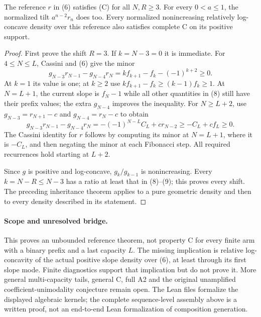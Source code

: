 \begin{theorem}
The reference $r$ in (6) satisfies (C) for all $N,R\ge3$.
For every $0<a\le1$, the normalized tilt $a^{n-2}r_n$ does too.
Every normalized nonincreasing relatively log-concave density over
this reference also satisfies complete C on its positive support.
\end{theorem}
\begin{proof}
First prove the shift $R=3$.  If $k=N-3=0$ it is immediate.
For $4\le N\le L$, Cassini and (6) give the minor
\[
 g_{N-3}r_{N-1}-g_{N-4}r_N
             =k f_{k+1}-f_k-(-1)^{k+2}\ge0.               \tag{8}
\]
At $k=1$ its value is one; at $k\ge2$ use
$kf_{k+1}-f_k\ge(k-1)f_k\ge1$.
At $N=L+1$, the current slope is $f_N-1$ while all other
quantities in (8) still have their prefix values; the extra
$g_{N-4}$ improves the inequality.
For $N\ge L+2$, use $g_{N-3}=r_{N+1}-c$ and
$g_{N-4}=r_N-c$ to obtain
\[
 g_{N-3}r_{N-1}-g_{N-4}r_N
       =-(-1)^{N-L}C_L+c r_{N-2}\ge -C_L+cf_L\ge0.         \tag{9}
\]
The Cassini identity for $r$ follows by computing its minor at
$N=L+1$, where it is $-C_L$, and then negating the minor at
each Fibonacci step.  All required recurrences hold starting at $L+2$.

Since $g$ is positive and log-concave, $g_k/g_{k-1}$ is
nonincreasing.  Every $k=N-R\le N-3$ has a ratio at least that
in (8)--(9); this proves every shift.  The preceding inheritance
theorem applies to a pure geometric density and then to every
density described in its statement.
\end{proof}

\paragraph{Scope and unresolved bridge.}
This proves an unbounded reference theorem, not property C for every
finite arm with a binary prefix and a last capacity $L$.
The missing implication is relative log-concavity of the actual
positive slope density over (6), at least through its first slope
mode.  Finite diagnostics support that implication but do not prove it.
More general multi-capacity tails, general C, full A2 and the original
unamplified coefficient-unimodality conjecture remain open.
The Lean files formalize the displayed algebraic kernels; the
complete sequence-level assembly above is a written proof, not an
end-to-end Lean formalization of composition generation.
